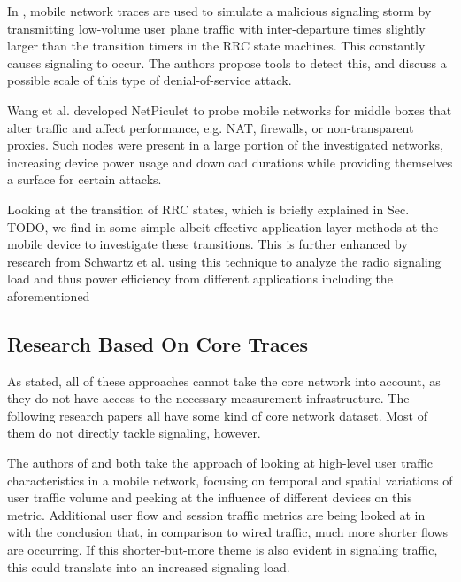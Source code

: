 In \cite{lee2007detection}, mobile network traces are used to simulate a malicious signaling storm by transmitting low-volume user plane traffic with inter-departure times slightly larger than the transition timers in the \ac{RRC} state machines. This constantly causes signaling to occur. The authors propose tools to detect this, and discuss a possible scale of this type of denial-of-service attack.
 
Wang et al.\cite{wang2011untold} developed NetPiculet to probe mobile networks for middle boxes that alter traffic and affect performance, e.g. NAT, firewalls, or non-transparent proxies. Such nodes were present in a large portion of the investigated networks, increasing device power usage and download durations while providing themselves a surface for certain attacks.

Looking at the transition of \ac{RRC} states, which is briefly explained in Sec. TODO, we find in \cite{5360763} some simple albeit effective application layer methods at the mobile device to investigate these transitions. This is further enhanced by research from Schwartz et al.\cite{schwartz2013angrybirds} using this technique to analyze the radio signaling load and thus power efficiency from different applications including the aforementioned


\subsection{Research Based On Core Traces}

As stated, all of these approaches cannot take the core network into account, as they do not have access to the necessary measurement infrastructure. The following research papers all have some kind of core network dataset. Most of them do not directly tackle signaling, however.

The authors of \cite{shafiq2011characterizing} and \cite{paul2011understanding} both take the approach of looking at high-level user traffic characteristics in a mobile network, focusing on temporal and spatial variations of user traffic volume and peeking at the influence of different devices on this metric. Additional user flow and session traffic metrics are being looked at in \cite{Zhang:2012:UCC:2377677.2377764} with the conclusion that, in comparison to wired traffic, much more shorter flows are occurring. If this shorter-but-more theme is also evident in signaling traffic, this could translate into an increased signaling load.

